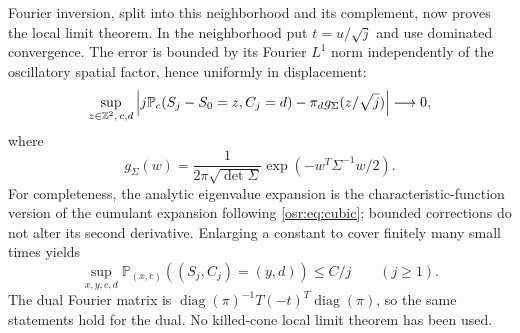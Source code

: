 \documentclass[11pt,letterpaper]{article}
\newcommand{\Prob}{\mathbb P}\newcommand{\E}{\mathbb E}
\newcommand{\diag}{\operatorname{diag}}\newcommand{\rad}{\operatorname{rad}}
\numberwithin{equation}{section}
\begin{document}
Fourier inversion, split into this neighborhood and its complement, now proves the local limit theorem. In the neighborhood put $t=u/\sqrt j$ and use dominated convergence. The error is bounded by its Fourier $L^1$ norm independently of the oscillatory spatial factor, hence uniformly in displacement:
\begin{equation}\label{osr:eq:llt}
 \sup_{z\in\Z^2,\,c,d}
 \left|j\Prob_c(S_j-S_0=z,C_j=d)-\pi_d g_\Sigma(z/\sqrt j)\right|\longrightarrow0,
\end{equation}
where
\[
 g_\Sigma(w)=\frac{1}{2\pi\sqrt{\det\Sigma}}
                 \exp(-w^T\Sigma^{-1}w/2).
\]
For completeness, the analytic eigenvalue expansion is the characteristic-function version of the cumulant expansion following \eqref{osr:eq:cubic}; bounded corrections do not alter its second derivative. Enlarging a constant to cover finitely many small times yields
\begin{equation}\label{osr:eq:kernelupper}
 \sup_{x,y,c,d}\Prob_{(x,c)}((S_j,C_j)=(y,d))\le C/j
 \qquad(j\ge1).
\end{equation}
The dual Fourier matrix is $\diag(\pi)^{-1}T(-t)^T\diag(\pi)$, so the same statements hold for the dual. No killed-cone local limit theorem has been used.
\end{document}
